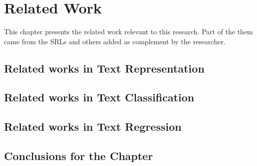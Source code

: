 \chapter{Related Work}\label{cap:related_works}

% 

This chapter presents the related work relevant to this research. Part of the them came from the SRLs and others added as complement by the researcher.

\section{Related works in Text Representation}


\section{Related works in Text Classification}


\section{Related works in Text Regression}


\section{Conclusions for the Chapter}






